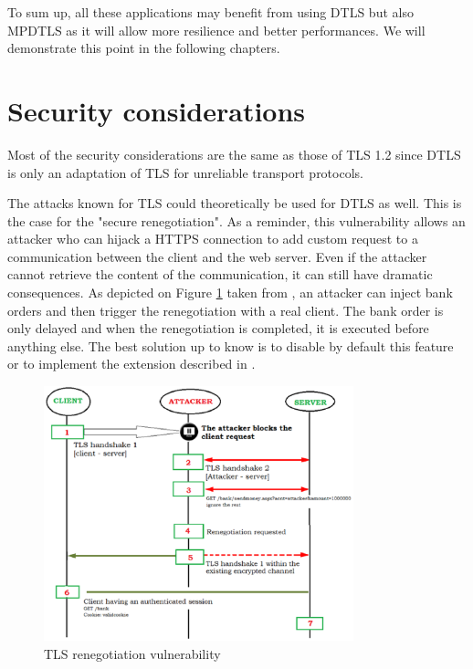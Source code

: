 To sum up, all these applications may benefit from using DTLS but also MPDTLS as it will allow more resilience and better performances. We will demonstrate this point in the following chapters.

\section{Security considerations}
\label{sec:tls-sec}

Most of the security considerations are the same as those of TLS 1.2 \cite{rfc5246} since DTLS is only an adaptation of TLS for unreliable transport protocols.

The attacks known for TLS could theoretically be used for DTLS as well. This is the case for the "secure renegotiation". As a reminder, this vulnerability allows an attacker who can hijack a HTTPS connection to add custom request to a communication between the client and the web server. Even if the attacker cannot retrieve the content of the communication, it can still have dramatic consequences. As depicted on Figure \ref{fig:tls-reneg} taken from \cite{tls-reneg}, an attacker can inject bank orders and then trigger the renegotiation with a real client. The bank order is only delayed and when the renegotiation is completed, it is executed before anything else. The best solution up to know is to disable by default this feature or to implement the extension described in \cite{rfc5746}.

\begin{figure}[!ht]
\centering
\includegraphics[width=0.8\textwidth]{images/TLSrenegotiation}
\caption{TLS renegotiation vulnerability}
\label{fig:tls-reneg}
\end{figure}


